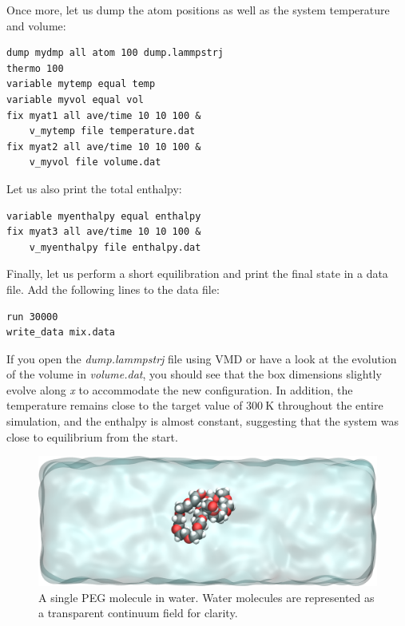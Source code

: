 \documentclass[9pt,tutorial]{livecoms}
\begin{document}
Once more, let us dump the atom positions as well as the system temperature and volume:
{\normalsize \begin{verbatim}
dump mydmp all atom 100 dump.lammpstrj
thermo 100
variable mytemp equal temp
variable myvol equal vol
fix myat1 all ave/time 10 10 100 &
    v_mytemp file temperature.dat
fix myat2 all ave/time 10 10 100 &
    v_myvol file volume.dat
\end{verbatim}}
Let us also print the total enthalpy:
{\normalsize \begin{verbatim}
variable myenthalpy equal enthalpy
fix myat3 all ave/time 10 10 100 &
    v_myenthalpy file enthalpy.dat
\end{verbatim}}
Finally, let us perform a short equilibration and print the
final state in a data file. Add the following lines to the data file:
{\normalsize \begin{verbatim}
run 30000
write_data mix.data
\end{verbatim}}
If you open the \textit{dump.lammpstrj} file using VMD or have a look at the evolution of the volume in \textit{volume.dat},
you should see that the box dimensions slightly evolve along \textit{x} to accommodate the new configuration. In addition, the temperature remains close to the target value of $300~\text{K}$ throughout the entire simulation, and the enthalpy is almost constant, suggesting that the system was close to equilibrium from the start.

\begin{figure}
\centering
\includegraphics[width=\linewidth]{PEG-solvated}
\caption{A single PEG molecule in water. Water molecules are represented as a transparent continuum field for clarity.}
\label{fig:PEG-solvated}
\end{figure}
\end{document}
